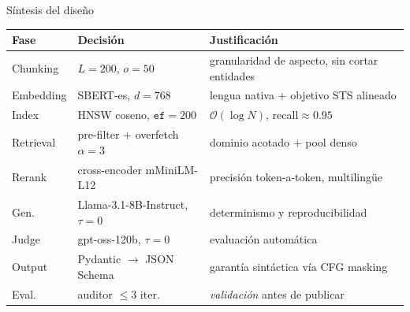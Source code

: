 \documentclass[10pt,aspectratio=169]{beamer}
\begin{document}
\begin{frame}{Síntesis del diseño}
	\begin{table}[h]
		\centering
		\scriptsize
		\begin{tabular}{@{}lll@{}}
			\toprule
			\textbf{Fase} & \textbf{Decisión}                   & \textbf{Justificación}                        \\ \midrule
			Chunking      & $L=200$, $o=50$                     & granularidad de aspecto, sin cortar entidades \\
			Embedding     & SBERT-es, $d=768$                   & lengua nativa + objetivo STS alineado         \\
			Index         & HNSW coseno, $\texttt{ef}=200$      & $\mathcal{O}(\log N)$, recall$\approx 0.95$   \\
			Retrieval     & pre-filter $+$ overfetch $\alpha=3$ & dominio acotado $+$ pool denso                \\
			Rerank        & cross-encoder mMiniLM-L12           & precisión token-a-token, multilingüe          \\
			Gen.          & Llama-3.1-8B-Instruct, $\tau=0$     & determinismo y reproducibilidad               \\
			Judge         & gpt-oss-120b, $\tau=0$              & evaluación automática                         \\
			Output        & Pydantic $\to$ JSON Schema          & garantía sintáctica vía CFG masking           \\
			Eval.         & auditor $\le 3$ iter.               & \emph{validación} antes de publicar           \\
			\bottomrule
		\end{tabular}
	\end{table}
\end{frame}
\end{document}
